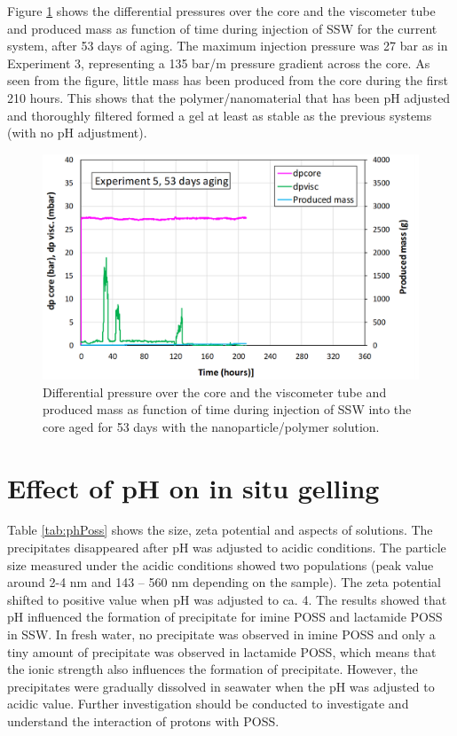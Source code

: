 Figure \ref{cht:gelexp5_2} shows the differential pressures over the core and the viscometer tube and produced mass as function of time during injection of SSW for the current system, after 53 days of aging.  The maximum injection pressure was 27 bar as in Experiment 3, representing a 135 bar/m pressure gradient across the core. As seen from the figure, little mass has been produced from the core during the first 210 hours. This shows that the polymer/nanomaterial that has been pH adjusted and thoroughly filtered formed a gel at least as stable as the previous systems (with no pH adjustment). 
\begin{figure}[h!]
    \centering
    \includegraphics[width=\textwidth]{img/cht/gelexp5_2.png}
    \caption{Differential pressure over the core and the viscometer tube and produced mass as function of time during injection of SSW into the core aged for 53 days with the nanoparticle/polymer solution.}
    \label{cht:gelexp5_2} %
\end{figure}

\FloatBarrier
\section{Effect of pH on in situ gelling \label{sec:phInSitu}} 

Table \ref{tab:phPoss} shows the size, zeta potential and aspects of solutions. The precipitates disappeared after pH was adjusted to acidic conditions. The particle size measured under the acidic conditions showed two populations (peak value around 2-4 nm and 143 – 560 nm depending on the sample). The zeta potential shifted to positive value when pH was adjusted to ca. 4.  The results showed that pH influenced the formation of precipitate for imine POSS and lactamide POSS in SSW. In fresh water, no precipitate was observed in imine POSS and only a tiny amount of precipitate was observed in lactamide POSS, which means that the ionic strength also influences the formation of precipitate. However, the precipitates were gradually dissolved in seawater when the pH was adjusted to acidic value.  Further investigation should be conducted to investigate and understand the interaction of protons with POSS.


